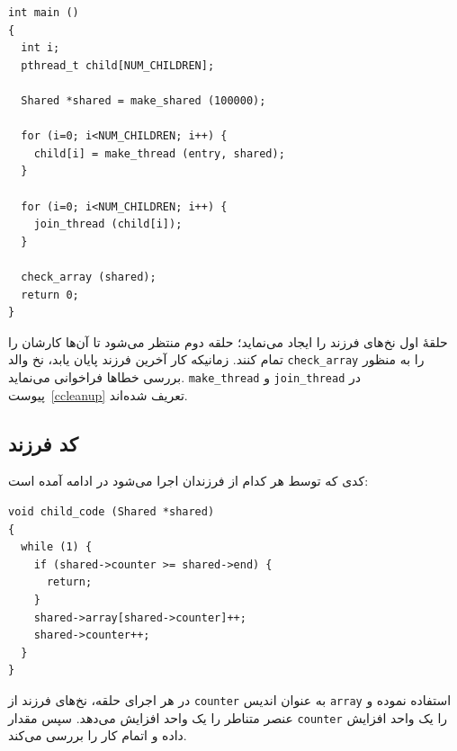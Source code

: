 \documentclass{book}
\begin{document}
\begin{latin}
\begin{lstlisting}
int main ()
{
  int i;
  pthread_t child[NUM_CHILDREN];

  Shared *shared = make_shared (100000);

  for (i=0; i<NUM_CHILDREN; i++) {
    child[i] = make_thread (entry, shared);
  }

  for (i=0; i<NUM_CHILDREN; i++) {
    join_thread (child[i]);
  }

  check_array (shared);
  return 0;
}
\end{lstlisting}
\end{latin}

    حلقهٔ اول نخ‌های فرزند را ایجاد می‌نماید؛ حلقه دوم منتظر می‌شود تا آن‌ها کارشان را تمام کنند. زمانیکه کار آخرین فرزند پایان یابد،‌
    نخ والد {\tt check\_array} را به منظور بررسی خطاها فراخوانی می‌نماید. {\tt make\_thread} و {\tt join\_thread}
    در پیوست~\ref{ccleanup} تعریف شده‌اند. 

\subsection{کد فرزند}

    کدی که توسط هر کدام از فرزندان اجرا می‌شود در ادامه آمده است: 

\begin{latin}
\begin{lstlisting}
void child_code (Shared *shared)
{
  while (1) {
    if (shared->counter >= shared->end) {
      return;
    }
    shared->array[shared->counter]++;
    shared->counter++;
  }
}
\end{lstlisting}
\end{latin}

    در هر اجرای حلقه، نخ‌های فرزند از {\tt counter} به عنوان اندیس {\tt array} استفاده نموده و عنصر متناطر را یک واحد افزایش می‌دهد. 
    سپس مقدار  {\tt counter}  را یک واحد افزایش داده و اتمام کار را بررسی می‌کند. 
    
\end{document}
